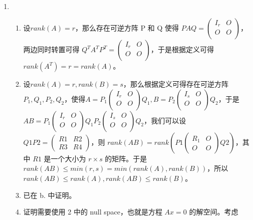\begin{solution}
	\heiti
	\ \\
	\begin{enumerate}
		\item \ \\
		\begin{enumerate}
			\item 设$ rank(A) = r$，那么存在可逆方阵 P 和 Q 使得 $PAQ = \begin{pmatrix} I_r & O \\ O & O \\ \end{pmatrix}$，两边同时转置可得 $ Q^TA^TP^T = \begin{pmatrix} I_r & O\\ O & O \\ \end{pmatrix} $，于是根据定义可得 $ rank(A^T) = r = rank(A)$。
			\item 设$ rank(A) = r, rank(B) = s$，那么根据定义可得存在可逆方阵 $ P_1, Q_1, P_2, Q_2$，使得$ A = P_1 \begin{pmatrix} I_r & O \\ O & O \\ \end{pmatrix} Q_1, B = P_2 \begin{pmatrix} I_s & O \\ O & O \\ \end{pmatrix} Q_2$，于是 $ AB = P_1 \begin{pmatrix} I_r & O \\ O & O \\ \end{pmatrix} Q_1 P_2 \begin{pmatrix} I_s & O \\ O & O \\ \end{pmatrix} Q_2$，我们可以设 $Q1P2 = \begin{pmatrix} R1 & R2 \\ R3 & R4 \end{pmatrix}$，则 $rank(AB) = rank(P1\begin{pmatrix} R_1 & O \\ O & O \end{pmatrix}Q2)$，其中 $R1$ 是一个大小为 ${r \times s}$ 的矩阵。于是 $rank(AB) \leq min(r, s) = min(rank(A), rank(B))$，所以 $ rank(AB) \leq rank(A), rank(AB) \leq rank(B)$。
			\item 已在 b. 中证明。
			\item 证明需要使用 2 中的 null space，也就是方程 $ Ax=0 $ 的解空间。考虑 

\end{enumerate}
\end{enumerate}
\end{solution}
